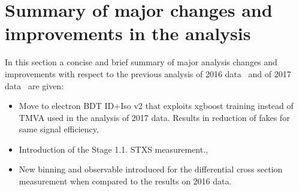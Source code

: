 \section{Summary of major changes and improvements in the analysis}
\label{sec:changes}

In this section a concise and brief summary of major analysis changes and improvements with respect to the previous analysis of 2016 data~\cite{CMS-HIG-16-041} and of 2017 data~\cite{CMS-PAS-HIG-18-001} are given:
\begin{itemize}
\item Move to electron BDT ID+Iso v2 that exploits xgboost training instead of TMVA used in the analysis of 2017 data. Results in reduction of fakes for same signal efficiency,
\item Introduction of the Stage 1.1. STXS measurement.,
\item New binning and observable introduced for the differential cross section measurement when compared to the results on 2016 data.
\end{itemize}




